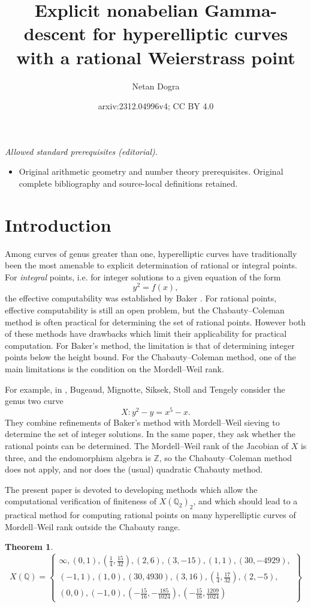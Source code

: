 \documentclass[11pt]{amsart}
\title{Explicit nonabelian Gamma-descent for hyperelliptic curves with a rational Weierstrass point}
\author{Netan Dogra}
\date{arxiv:2312.04996v4; CC BY 4.0}
\def\Q{\mathbb Q}
\theoremstyle{plain}
\newtheorem{theorem}{Theorem}
\theoremstyle{definition}
\begin{document}
\maketitle
\noindent\textit{Allowed standard prerequisites (editorial).}\begin{itemize}
\item Original arithmetic geometry and number theory prerequisites. Original complete bibliography and source-local definitions retained.
\end{itemize}\medskip
\section{Introduction}

Among curves of genus greater than one, hyperelliptic curves have traditionally been the most amenable to explicit determination of rational or integral points. For \textit{integral} points, i.e. for integer solutions to a given equation of the form
\[
y^2 =f(x),
\]
the effective computability was established by Baker \cite{baker}. For rational points, effective computability is still an open problem, but the Chabauty--Coleman method is often practical for determining the set of rational points. However both of these methods have drawbacks which limit their applicability for practical computation. For Baker's method, the limitation is that of determining integer points below the height bound. For the Chabauty--Coleman method, one of the main limitations is the condition on the Mordell--Weil rank.

For example, in \cite{BMSST}, Bugeaud, Mignotte, Siksek, Stoll and Tengely consider the genus two curve
\[
X: y^2 -y =x^5 -x.
\]
They combine refinements of Baker's method with Mordell--Weil sieving to determine the set of integer solutions. In the same paper, they ask whether the rational points can be determined. The Mordell--Weil rank of the Jacobian of $X$ is three, and the endomorphism algebra is $\mathbb{Z}$, so the Chabauty--Coleman method does not apply, and nor does the (usual) quadratic Chabauty method.

The present paper is devoted to developing methods which allow the computational verification of finiteness of $X(\Q _2 )_2 $, and which should lead to a practical method for computing rational points on many hyperelliptic curves of Mordell--Weil rank outside the Chabauty range.
\begin{theorem}\label{thm:BMSST_rational}
\[
X(\Q )=\left\{ \begin{array}{c} \infty ,(0, 1), (\frac{1}{4}, \frac{15}{32}), (2, 6),(3, -15), (1, 1), (30, -4929),  \\ (-1, 1), (1, 0), (30, 4930), (3, 16 ), (\frac{1}{4}, \frac{17}{32}), (2, -5), \\ (0, 0), (-1, 0), (-\frac{15}{16}, -\frac{185}{1024}), (-\frac{15}{16}, \frac{1209}{1024}) \end{array} \right\}
\]
\end{theorem}
\end{document}
